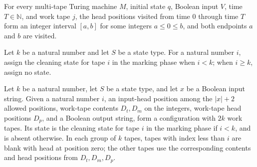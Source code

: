 \begin{lemma}
\label{Complexity.LogProg.visited_interval}
\leanok
{}
For every multi-tape Turing machine $M$, initial state $q$, Boolean input $V$, time
$T\in\mathbb N$, and work tape $j$, the head positions visited from time $0$ through
time $T$ form an integer interval $[a,b]$ for some integers $a\le 0\le b$, and both
endpoints $a$ and $b$ are visited.
\end{lemma}

\begin{definition}
\label{Complexity.LogProg.stSt}
\leanok
{}
Let $k$ be a natural number and let $S$ be a state type. For a natural number $i$,
assign the cleaning state for tape $i$ in the marking phase when $i<k$; when $i\ge k$,
assign no state.
\end{definition}

\begin{definition}
\label{Complexity.LogProg.stg}
\leanok
{}
Let $k$ be a natural number, let $S$ be a state type, and let $x$ be a Boolean input
string. Given a natural number $i$, an input-head position among the $|x|+2$ allowed
positions, work-tape contents $D_t,D_m$ on the integers, work-tape head positions $D_p$,
and a Boolean output string, form a configuration with $2k$ work tapes. Its state is the
cleaning state for tape $i$ in the marking phase if $i<k$, and is absent otherwise. In
each group of $k$ tapes, tapes with index less than $i$ are blank with head at position
zero; the other tapes use the corresponding contents and head positions from
$D_t,D_m,D_p$.
\end{definition}

